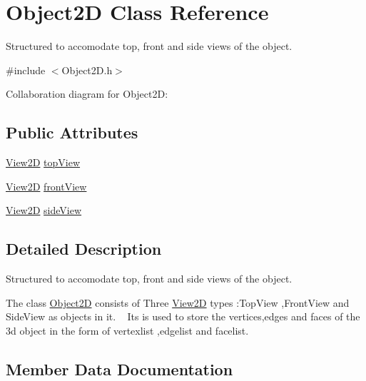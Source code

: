 \hypertarget{class_object2_d}{}\section{Object2D Class Reference}
\label{class_object2_d}


Structured to accomodate top, front and side views of the object.  




{\ttfamily \#include $<$Object2\+D.\+h$>$}



Collaboration diagram for Object2D\+:
\subsection*{Public Attributes}
\begin{DoxyCompactItemize}
\item 
\mbox{\hyperlink{class_view2_d}{View2D}} \mbox{\hyperlink{class_object2_d_adadaec6529bf5ea273f559e6e068486b}{top\+View}}
\item 
\mbox{\hyperlink{class_view2_d}{View2D}} \mbox{\hyperlink{class_object2_d_ad630029a63ec46fa82edd6a72d365733}{front\+View}}
\item 
\mbox{\hyperlink{class_view2_d}{View2D}} \mbox{\hyperlink{class_object2_d_a2a37b1a8f9b5968c92b22c2c2c7bb2d4}{side\+View}}
\end{DoxyCompactItemize}


\subsection{Detailed Description}
Structured to accomodate top, front and side views of the object. 

The class \mbox{\hyperlink{class_object2_d}{Object2D}} consists of Three \mbox{\hyperlink{class_view2_d}{View2D}} types \+:Top\+View ,Front\+View and Side\+View as objects in it. ~\newline
Its is used to store the vertices,edges and faces of the 3d object in the form of vertexlist ,edgelist and facelist. 

\subsection{Member Data Documentation}
\mbox{\label{class_object2_d_ad630029a63ec46fa82edd6a72d365733}} 
